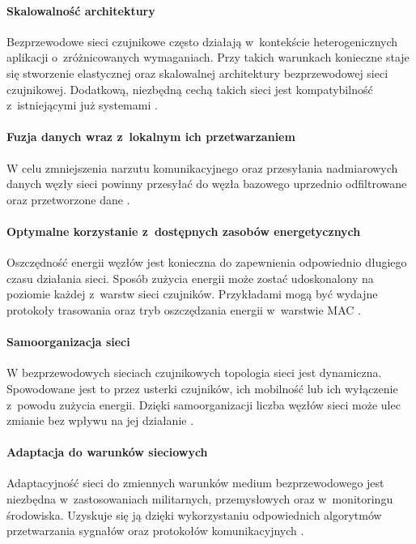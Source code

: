 \paragraph{Skalowalność architektury}
Bezprzewodowe sieci czujnikowe często działają w~kontekście heterogenicznych aplikacji o~zróżnicowanych wymaganiach. Przy takich warunkach konieczne staje się stworzenie elastycznej oraz skalowalnej architektury bezprzewodowej sieci czujnikowej. Dodatkową, niezbędną cechą takich sieci jest kompatybilność z~istniejącymi już systemami \cite{Pakzad2008}.

\paragraph{Fuzja danych wraz z~lokalnym ich przetwarzaniem}
W celu zmniejszenia narzutu komunikacyjnego oraz przesyłania nadmiarowych danych węzły sieci powinny przesyłać do węzła bazowego uprzednio odfiltrowane oraz przetworzone dane \cite{Wu2017, Abdelgawad2012}.

\paragraph{Optymalne korzystanie z~dostępnych zasobów energetycznych}
Oszczędność energii węzłów jest konieczna do zapewnienia odpowiednio długiego czasu działania sieci. Sposób zużycia energii może zostać udoskonalony na poziomie każdej z~warstw sieci czujników. Przykładami mogą być wydajne protokoły trasowania \cite{Pereira2016} oraz tryb oszczędzania energii w~warstwie MAC \cite{Michael2006}.

\paragraph{Samoorganizacja sieci}
W bezprzewodowych sieciach czujnikowych topologia sieci jest dynamiczna. Spowodowane jest to przez usterki czujników, ich mobilność lub ich wyłączenie z~powodu zużycia energii. Dzięki samoorganizacji liczba węzłów sieci może ulec zmianie bez wpływu na jej działanie \cite{Gungor2009}.

\paragraph{Adaptacja do warunków sieciowych}
Adaptacyjność sieci do zmiennych warunków medium bezprzewodowego jest niezbędna w~zastosowaniach militarnych, przemysłowych oraz w~monitoringu środowiska. Uzyskuje się ją dzięki wykorzystaniu odpowiednich algorytmów przetwarzania sygnałów oraz protokołów komunikacyjnych \cite{Gungor2009}.

